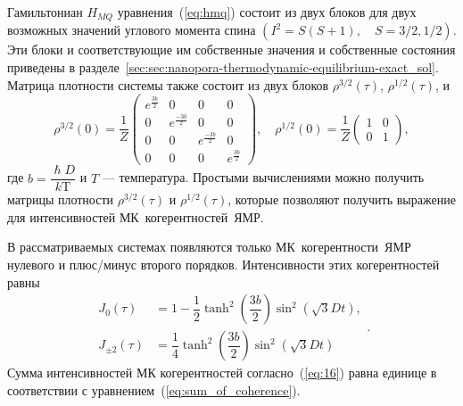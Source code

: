 Гамильтониан $H_{MQ}$ уравнения~(\ref{eq:hmq}) состоит из двух блоков для двух возможных значений углового момента спина $(I^2 = S(S+1), \quad S=3/2,1/2)$.
Эти блоки и соответствующие им собственные значения и собственные состояния приведены
в разделе~\ref{sec:sec:nanopora-thermodynamic-equilibrium-exact_sol}.
Матрица плотности системы также состоит из двух блоков $\rho^{3/2}(\tau)$, $\rho^{1/2}(\tau)$, и
%
\begin{equation}
  \label{eq:15}
  \rho^{3/2}(0) = \dfrac 1 Z
  \begin{pmatrix}
    e^{\frac{3b}{2}} & 0 & 0 & 0
    \\
    0 & e^{\frac{-3b}{2}} & 0 & 0
    \\
    0 & 0 & e^{\frac{-3b}{2}} & 0
    \\
    0 & 0 & 0 & e^{\frac{3b}{2}}
  \end{pmatrix},
  \quad
  \rho^{1/2}(0) = \dfrac 1 Z
  \begin{pmatrix}
    	1 & 0
    \\
    0 & 1
  \end{pmatrix},
\end{equation}
%
где $b = \dfrac{\hslash D}{k\mathrm{T}}$ и $T$ --- температура.
Простыми вычислениями можно получить матрицы плотности $\rho^{3/2}(\tau)$ и $\rho^{1/2}(\tau)$,
которые позволяют получить выражение для интенсивностей МК~когерентностей~ЯМР.

В рассматриваемых системах появляются только МК~когерентности~ЯМР нулевого и плюс/минус второго порядков.
Интенсивности этих когерентностей равны
%
\begin{equation}
  \begin{split}
    \label{eq:16}
    J_0(\tau) & = 1
    - \dfrac 1 2 \tanh^2\left( \dfrac{3b}{2} \right)
      \sin^2 \left( \sqrt{3} Dt \right),
    \\
    J_{\pm2}(\tau) & = \dfrac{1}{4}
      \tanh^2 \left( \dfrac{3b}{2} \right)
      \sin^2 \left( \sqrt{3} Dt \right)
  \end{split}.
\end{equation}
%
Сумма интенсивностей МК когерентностей согласно~(\ref{eq:16}) равна единице в соответствии с уравнением~(\ref{eq:sum_of_coherence}).

